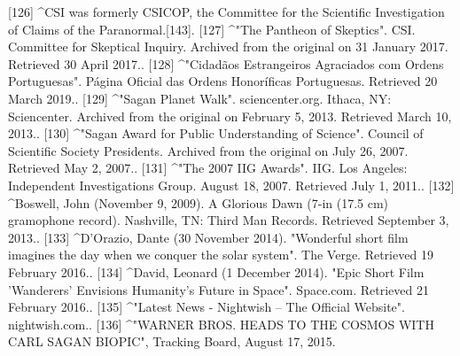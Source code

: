 [126]
^CSI was formerly CSICOP, the Committee for the Scientific Investigation of Claims of the Paranormal.[143].
[127]
^"The Pantheon of Skeptics". CSI. Committee for Skeptical Inquiry. Archived from the original on 31 January 2017. Retrieved 30 April 2017..
[128]
^"Cidadãos Estrangeiros Agraciados com Ordens Portuguesas". Página Oficial das Ordens Honoríficas Portuguesas. Retrieved 20 March 2019..
[129]
^"Sagan Planet Walk". sciencenter.org. Ithaca, NY: Sciencenter. Archived from the original on February 5, 2013. Retrieved March 10, 2013..
[130]
^"Sagan Award for Public Understanding of Science". Council of Scientific Society Presidents. Archived from the original on July 26, 2007. Retrieved May 2, 2007..
[131]
^"The 2007 IIG Awards". IIG. Los Angeles: Independent Investigations Group. August 18, 2007. Retrieved July 1, 2011..
[132]
^Boswell, John (November 9, 2009). A Glorious Dawn (7-in (17.5 cm) gramophone record). Nashville, TN: Third Man Records. Retrieved September 3, 2013..
[133]
^D'Orazio, Dante (30 November 2014). "Wonderful short film imagines the day when we conquer the solar system". The Verge. Retrieved 19 February 2016..
[134]
^David, Leonard (1 December 2014). "Epic Short Film 'Wanderers' Envisions Humanity's Future in Space". Space.com. Retrieved 21 February 2016..
[135]
^"Latest News - Nightwish – The Official Website". nightwish.com..
[136]
^"WARNER BROS. HEADS TO THE COSMOS WITH CARL SAGAN BIOPIC", Tracking Board, August 17, 2015.